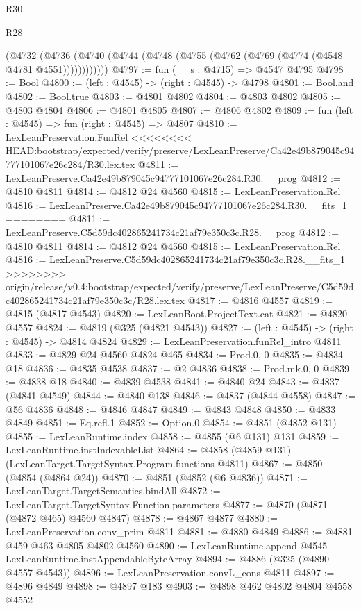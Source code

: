 \begin{lexlean}{R30}
\begin{lexlean}{R28}
\begin{coremodule}
{{{{{{{{{{{{{{{{{{{{{{{{{{{{{{{{{{{{{{{{{{{{{{{{{{{{{{{{{{{{{{{{{{{{{{{{{{{{{{{{{{{{{{{{{{{{{{{{{{{{{{{{{{{{{{{{{{{{{{{{{{{{{{{{{{{{{{{{{{{{{{{        (@4732
          (@4736 (@4740 (@4744 (@4748 (@4755 (@4762 (@4769 (@4774 (@4548 @4781 @4551))))))))))))
@4797 := fun (__s : @4715) => @4547 @4795
@4798 := Bool
@4800 := (left : @4545) -> (right : @4545) -> @4798
@4801 := Bool.and
@4802 := Bool.true
@4803 := @4801 @4802
@4804 := @4803 @4802
@4805 := @4803 @4804
@4806 := @4801 @4805
@4807 := @4806 @4802
@4809 := fun (left : @4545) => fun (right : @4545) => @4807
@4810 := LexLeanPreservation.FunRel
<<<<<<<< HEAD:bootstrap/expected/verify/preserve/LexLeanPreserve/Ca42e49b879045c94777101067e26c284/R30.lex.tex
@4811 := LexLeanPreserve.Ca42e49b879045c94777101067e26c284.R30.__prog
@4812 := @4810 @4811
@4814 := @4812 @24 @4560
@4815 := LexLeanPreservation.Rel
@4816 := LexLeanPreserve.Ca42e49b879045c94777101067e26c284.R30.__fits_1
========
@4811 := LexLeanPreserve.C5d59dc402865241734c21af79e350c3c.R28.__prog
@4812 := @4810 @4811
@4814 := @4812 @24 @4560
@4815 := LexLeanPreservation.Rel
@4816 := LexLeanPreserve.C5d59dc402865241734c21af79e350c3c.R28.__fits_1
>>>>>>>> origin/release/v0.4:bootstrap/expected/verify/preserve/LexLeanPreserve/C5d59dc402865241734c21af79e350c3c/R28.lex.tex
@4817 := @4816 @4557
@4819 := @4815 (@4817 @4543)
@4820 := LexLeanBoot.ProjectText.cat
@4821 := @4820 @4557
@4824 := @4819 (@325 (@4821 @4543))
@4827 := (left : @4545) -> (right : @4545) -> @4814 @4824
@4829 := LexLeanPreservation.funRel_intro @4811
@4833 := @4829 @24 @4560 @4824 @465
@4834 := Prod.{0, 0}
@4835 := @4834 @18
@4836 := @4835 @4538
@4837 := @2 @4836
@4838 := Prod.mk.{0, 0}
@4839 := @4838 @18
@4840 := @4839 @4538
@4841 := @4840 @24
@4843 := @4837 (@4841 @4549)
@4844 := @4840 @138
@4846 := @4837 (@4844 @4558)
@4847 := @56 @4836
@4848 := @4846 @4847
@4849 := @4843 @4848
@4850 := @4833 @4849
@4851 := Eq.refl.{1}
@4852 := Option.{0}
@4854 := @4851 (@4852 @131)
@4855 := LexLeanRuntime.index
@4858 := @4855 (@6 @131) @131
@4859 := LexLeanRuntime.instIndexableList
@4864 := @4858 (@4859 @131) (LexLeanTarget.TargetSyntax.Program.functions @4811)
@4867 := @4850 (@4854 (@4864 @24))
@4870 := @4851 (@4852 (@6 @4836))
@4871 := LexLeanTarget.TargetSemantics.bindAll
@4872 := LexLeanTarget.TargetSyntax.Function.parameters
@4877 := @4870 (@4871 (@4872 @465) @4560 @4847)
@4878 := @4867 @4877
@4880 := LexLeanPreservation.conv_prim @4811
@4881 := @4880 @4849
@4886 := @4881 @459 @463 @4805 @4802 @4560
@4890 := LexLeanRuntime.append @4545 LexLeanRuntime.instAppendableByteArray
@4894 := @4886 (@325 (@4890 @4557 @4543))
@4896 := LexLeanPreservation.convL_cons @4811
@4897 := @4896 @4849
@4898 := @4897 @183
@4903 := @4898 @462 @4802 @4804 @4558 @4552
}}}}}}}}}}}}}}}}}}}}}}}}}}}}}}}}}}}}}}}}}}}}}}}}}}}}}}}}}}}}}}}}}}}}}}}}}}}}}}}}}}}}}}}}}}}}}}}}}}}}}}}}}}}}}}}}}}}}}}}}}}}}}}}}}}}}}}}}}}}}}}}
\end{coremodule}
\end{lexlean}
\end{lexlean}
